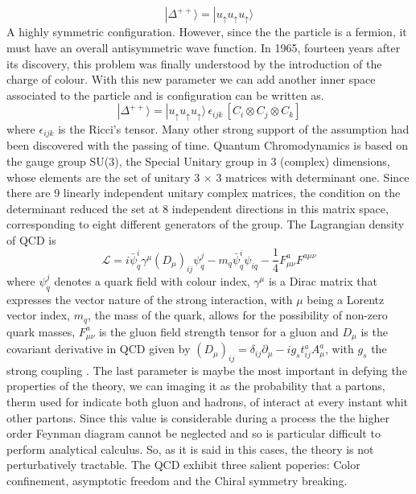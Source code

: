 \documentclass[12pt,a4paper]{book}
\begin{document}
	\[
	|\Delta^{++}\rangle = | u_{\uparrow} u_{\uparrow} u_{\uparrow} \rangle
	\]
	A highly symmetric configuration. However, since the the particle is a fermion, it must have an overall antisymmetric wave function. In 1965, fourteen years after its discovery, this problem was finally understood by the introduction of the charge of colour. With this new parameter we can add another inner space associated to the particle and is configuration can be written as.
	\[
	|\Delta^{++}\rangle = | u_{\uparrow} u_{\uparrow} u_{\uparrow} \rangle \, \epsilon_{ijk} \, \left[ C_i \otimes C_j \otimes C_k \right]
	\]
	where $\epsilon_{ijk}$ is the Ricci's tensor. Many other strong support of the assumption had been discovered with the passing of time. Quantum Chromodynamics is based on the gauge group SU(3), the Special Unitary group in 3	(complex) dimensions, whose elements are the set of unitary 3 × 3 matrices with determinant one. Since there are 9 linearly independent unitary complex matrices, the condition on the determinant reduced the set at 8 independent directions in this matrix space, corresponding to eight different generators of the group.  The Lagrangian density of QCD is
	\begin{equation}
		\boxed{\mathcal{L}= i \bar{\psi}^i_q \gamma^\mu(D_\mu)_{ij}\psi^j_q- m_q \bar{\psi}^i_q \psi_{iq}-\frac{1}{4} F^a_{\mu \nu} F^{a\mu \nu}}
		\label{eq:QCD_lagrangian}
	\end{equation} 
	where $\psi^j_q$ denotes a quark field with colour index, $\gamma^\mu$ is a Dirac matrix that expresses the vector nature of the strong interaction, with $\mu$ being a Lorentz vector index, $m_q$, the mass of the quark, allows for the possibility of non-zero quark masses, $F^a_{\mu \nu}$ is the gluon field strength tensor for a gluon and $D_\mu$ is the covariant derivative in QCD given by $(D_\mu)_{ij}= \delta_{ij} \partial_\mu - ig_s t^a_{ij} A^a_\mu$, with $g_s$ the strong coupling \cite{Skands_2013}.
	The last parameter is maybe the most important in defying the properties of the theory, we can imaging it as the probability that a partons, therm used for indicate both gluon and hadrons, of interact at every instant whit other partons. Since this value is considerable during a process the the higher order Feynman diagram cannot be neglected and so is particular difficult to perform analytical calculus. So, as it is said in this cases, the theory is not perturbatively tractable.  
	The QCD exhibit three salient poperies: Color confinement, asymptotic freedom and the 	Chiral symmetry breaking. 
\end{document}
